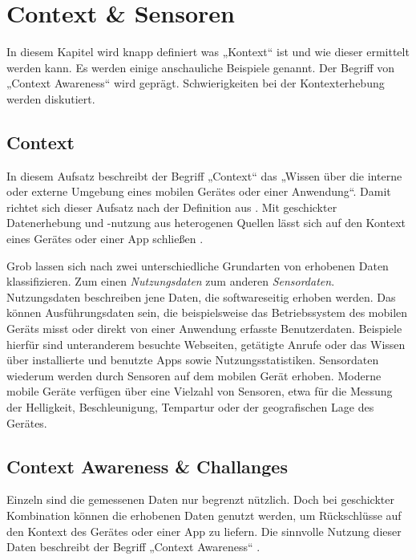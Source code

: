 \chapter{Context \& Sensoren}
\label{chap:context}

In diesem Kapitel wird knapp definiert was „Kontext“ ist und wie dieser ermittelt werden kann. Es werden einige anschauliche Beispiele genannt. Der Begriff von „Context Awareness“ wird geprägt. Schwierigkeiten bei der Kontexterhebung werden diskutiert.

\section{Context}

In diesem Aufsatz beschreibt der Begriff „Context“ das „Wissen über die interne oder externe Umgebung eines mobilen Gerätes oder einer Anwendung“. Damit richtet sich dieser Aufsatz nach der Definition aus \cite{context2015}. Mit geschickter Datenerhebung und -nutzung aus heterogenen Quellen lässt sich auf den Kontext eines Gerätes oder einer App schließen \cite{orsini2016}.

Grob lassen sich nach \cite{context2015} zwei unterschiedliche Grundarten von erhobenen Daten klassifizieren. Zum einen \textit{Nutzungsdaten} zum anderen \textit{Sensordaten}. Nutzungsdaten beschreiben jene Daten, die softwareseitig erhoben werden. Das können Ausführungsdaten sein, die beispielsweise das Betriebssystem des mobilen Geräts misst oder direkt von einer Anwendung erfasste Benutzerdaten. Beispiele hierfür sind unteranderem besuchte Webseiten, getätigte Anrufe oder das Wissen über installierte und benutzte Apps sowie Nutzungsstatistiken. Sensordaten wiederum werden durch Sensoren auf dem mobilen Gerät erhoben. Moderne mobile Geräte verfügen über eine Vielzahl von Sensoren, etwa für die Messung der Helligkeit, Beschleunigung, Tempartur oder der geografischen Lage des Gerätes.

\section{Context Awareness \& Challanges}

Einzeln sind die gemessenen Daten nur begrenzt nützlich. Doch bei geschickter Kombination können die erhobenen Daten genutzt werden, um Rückschlüsse auf den Kontext des Gerätes oder einer App zu liefern. Die sinnvolle Nutzung dieser Daten beschreibt der Begriff „Context Awareness“ \cite{context2015, orsini2016}.

